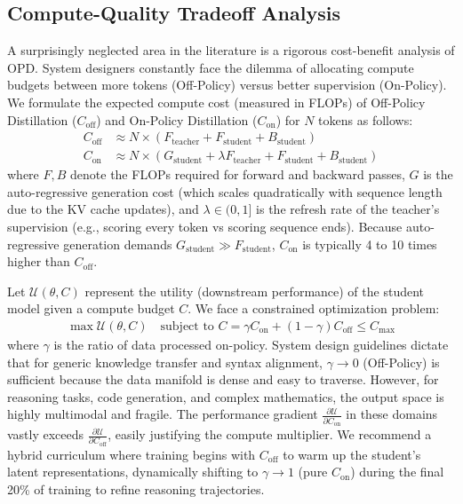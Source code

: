 \subsection{Compute-Quality Tradeoff Analysis}
A surprisingly neglected area in the literature is a rigorous cost-benefit analysis of OPD. System designers constantly face the dilemma of allocating compute budgets between more tokens (Off-Policy) versus better supervision (On-Policy). We formulate the expected compute cost (measured in FLOPs) of Off-Policy Distillation ($C_{\text{off}}$) and On-Policy Distillation ($C_{\text{on}}$) for $N$ tokens as follows:
\begin{align}
C_{\text{off}} &\approx N \times (F_{\text{teacher}} + F_{\text{student}} + B_{\text{student}}) \\
C_{\text{on}} &\approx N \times \left( G_{\text{student}} + \lambda F_{\text{teacher}} + F_{\text{student}} + B_{\text{student}} \right)
\end{align}
where $F, B$ denote the FLOPs required for forward and backward passes, $G$ is the auto-regressive generation cost (which scales quadratically with sequence length due to the KV cache updates), and $\lambda \in (0, 1]$ is the refresh rate of the teacher's supervision (e.g., scoring every token vs scoring sequence ends). Because auto-regressive generation demands $G_{\text{student}} \gg F_{\text{student}}$, $C_{\text{on}}$ is typically 4 to 10 times higher than $C_{\text{off}}$.

Let $\mathcal{U}(\theta, C)$ represent the utility (downstream performance) of the student model given a compute budget $C$. We face a constrained optimization problem:
\begin{align}
\max \mathcal{U}(\theta, C) \quad \text{subject to } C = \gamma C_{\text{on}} + (1 - \gamma) C_{\text{off}} \le C_{\text{max}}
\end{align}
where $\gamma$ is the ratio of data processed on-policy. System design guidelines dictate that for generic knowledge transfer and syntax alignment, $\gamma \to 0$ (Off-Policy) is sufficient because the data manifold is dense and easy to traverse. However, for reasoning tasks, code generation, and complex mathematics, the output space is highly multimodal and fragile. The performance gradient $\frac{\partial \mathcal{U}}{\partial C_{\text{on}}}$ in these domains vastly exceeds $\frac{\partial \mathcal{U}}{\partial C_{\text{off}}}$, easily justifying the compute multiplier. We recommend a hybrid curriculum where training begins with $C_{\text{off}}$ to warm up the student's latent representations, dynamically shifting to $\gamma \to 1$ (pure $C_{\text{on}}$) during the final 20\% of training to refine reasoning trajectories.

